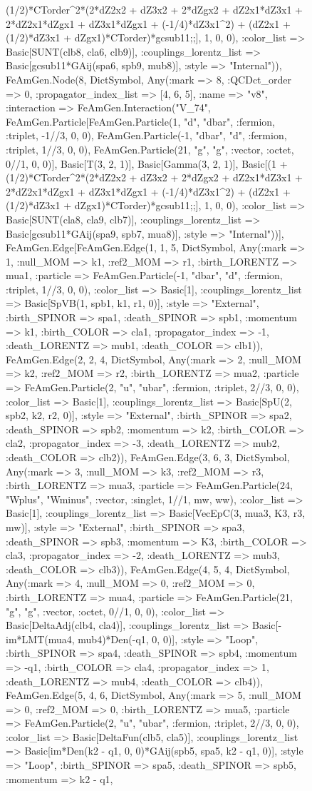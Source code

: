 \documentclass{revtex4}
\begin{document}
\begin{figure}[!htb]
\begin{center}
{(1/2)*CTorder^2*(2*dZ2x2 + dZ3x2 + 2*dZgx2 + dZ2x1*dZ3x1 + 2*dZ2x1*dZgx1 + dZ3x1*dZgx1 + (-1/4)*dZ3x1^2) + (dZ2x1 + (1/2)*dZ3x1 + dZgx1)*CTorder)*gcsub11;;], 1, 0, 0), :color_list => Basic[SUNT(clb8, cla6, clb9)], :couplings_lorentz_list => Basic[gcsub11*GAij(spa6, spb9, mub8)], :style => "Internal")), FeAmGen.Node(8, Dict{Symbol, Any}(:mark => 8, :QCDct_order => 0, :propagator_index_list => [4, 6, 5], :name => "v8", :interaction => FeAmGen.Interaction("V_74", FeAmGen.Particle[FeAmGen.Particle(1, "d", "dbar", :fermion, :triplet, -1//3, 0, 0), FeAmGen.Particle(-1, "dbar", "d", :fermion, :triplet, 1//3, 0, 0), FeAmGen.Particle(21, "g", "g", :vector, :octet, 0//1, 0, 0)], Basic[T(3, 2, 1)], Basic[Gamma(3, 2, 1)], Basic[(1 + (1/2)*CTorder^2*(2*dZ2x2 + dZ3x2 + 2*dZgx2 + dZ2x1*dZ3x1 + 2*dZ2x1*dZgx1 + dZ3x1*dZgx1 + (-1/4)*dZ3x1^2) + (dZ2x1 + (1/2)*dZ3x1 + dZgx1)*CTorder)*gcsub11;;], 1, 0, 0), :color_list => Basic[SUNT(cla8, cla9, clb7)], :couplings_lorentz_list => Basic[gcsub11*GAij(spa9, spb7, mua8)], :style => "Internal"))], FeAmGen.Edge[FeAmGen.Edge(1, 1, 5, Dict{Symbol, Any}(:mark => 1, :null_MOM => k1, :ref2_MOM => r1, :birth_LORENTZ => mua1, :particle => FeAmGen.Particle(-1, "dbar", "d", :fermion, :triplet, 1//3, 0, 0), :color_list => Basic[1], :couplings_lorentz_list => Basic[SpVB(1, spb1, k1, r1, 0)], :style => "External", :birth_SPINOR => spa1, :death_SPINOR => spb1, :momentum => k1, :birth_COLOR => cla1, :propagator_index => -1, :death_LORENTZ => mub1, :death_COLOR => clb1)), FeAmGen.Edge(2, 2, 4, Dict{Symbol, Any}(:mark => 2, :null_MOM => k2, :ref2_MOM => r2, :birth_LORENTZ => mua2, :particle => FeAmGen.Particle(2, "u", "ubar", :fermion, :triplet, 2//3, 0, 0), :color_list => Basic[1], :couplings_lorentz_list => Basic[SpU(2, spb2, k2, r2, 0)], :style => "External", :birth_SPINOR => spa2, :death_SPINOR => spb2, :momentum => k2, :birth_COLOR => cla2, :propagator_index => -3, :death_LORENTZ => mub2, :death_COLOR => clb2)), FeAmGen.Edge(3, 6, 3, Dict{Symbol, Any}(:mark => 3, :null_MOM => k3, :ref2_MOM => r3, :birth_LORENTZ => mua3, :particle => FeAmGen.Particle(24, "Wplus", "Wminus", :vector, :singlet, 1//1, mw, ww), :color_list => Basic[1], :couplings_lorentz_list => Basic[VecEpC(3, mua3, K3, r3, mw)], :style => "External", :birth_SPINOR => spa3, :death_SPINOR => spb3, :momentum => K3, :birth_COLOR => cla3, :propagator_index => -2, :death_LORENTZ => mub3, :death_COLOR => clb3)), FeAmGen.Edge(4, 5, 4, Dict{Symbol, Any}(:mark => 4, :null_MOM => 0, :ref2_MOM => 0, :birth_LORENTZ => mua4, :particle => FeAmGen.Particle(21, "g", "g", :vector, :octet, 0//1, 0, 0), :color_list => Basic[DeltaAdj(clb4, cla4)], :couplings_lorentz_list => Basic[-im*LMT(mua4, mub4)*Den(-q1, 0, 0)], :style => "Loop", :birth_SPINOR => spa4, :death_SPINOR => spb4, :momentum => -q1, :birth_COLOR => cla4, :propagator_index => 1, :death_LORENTZ => mub4, :death_COLOR => clb4)), FeAmGen.Edge(5, 4, 6, Dict{Symbol, Any}(:mark => 5, :null_MOM => 0, :ref2_MOM => 0, :birth_LORENTZ => mua5, :particle => FeAmGen.Particle(2, "u", "ubar", :fermion, :triplet, 2//3, 0, 0), :color_list => Basic[DeltaFun(clb5, cla5)], :couplings_lorentz_list => Basic[im*Den(k2 - q1, 0, 0)*GAij(spb5, spa5, k2 - q1, 0)], :style => "Loop", :birth_SPINOR => spa5, :death_SPINOR => spb5, :momentum => k2 - q1, }
\end{center}
\end{figure}
\end{document}
